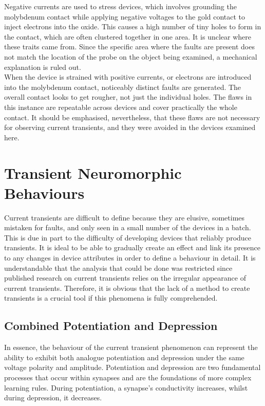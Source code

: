 \noindent Negative currents are used to stress devices, which involves grounding the molybdenum contact while applying negative voltages to the gold contact to inject electrons into the oxide. This causes a high number of tiny holes to form in the contact, which are often clustered together in one area. It is unclear where these traits came from. Since the specific area where the faults are present does not match the location of the probe on the object being examined, a mechanical explanation is ruled out. \\

\noindent When the device is strained with positive currents, or electrons are introduced into the molybdenum contact, noticeably distinct faults are generated. The overall contact looks to get rougher, not just the individual holes. The flaws in this instance are repeatable across devices and cover practically the whole contact. It should be emphasised, nevertheless, that these flaws are not necessary for observing current transients, and they were avoided in the devices examined here.

\section[Transient Neuromorphic Behaviours]{Transient Neuromorphic Behaviours}

Current transients are difficult to define because they are elusive, sometimes mistaken for faults, and only seen in a small number of the devices in a batch. This is due in part to the difficulty of developing devices that reliably produce transients. It is ideal to be able to gradually create an effect and link its presence to any changes in device attributes in order to define a behaviour in detail. It is understandable that the analysis that could be done was restricted since published research on current transients relies on the irregular appearance of current transients. Therefore, it is obvious that the lack of a method to create transients is a crucial tool if this phenomena is fully comprehended.

\subsection[Combined Potentiation and Depression]{Combined Potentiation and Depression}

In essence, the behaviour of the current transient phenomenon can represent the ability to exhibit both analogue potentiation and depression under the same voltage polarity and amplitude. Potentiation and depression are two fundamental processes that occur within synapses and are the foundations of more complex learning rules. During potentiation, a synapse's conductivity increases, whilst during depression, it decreases. \\


